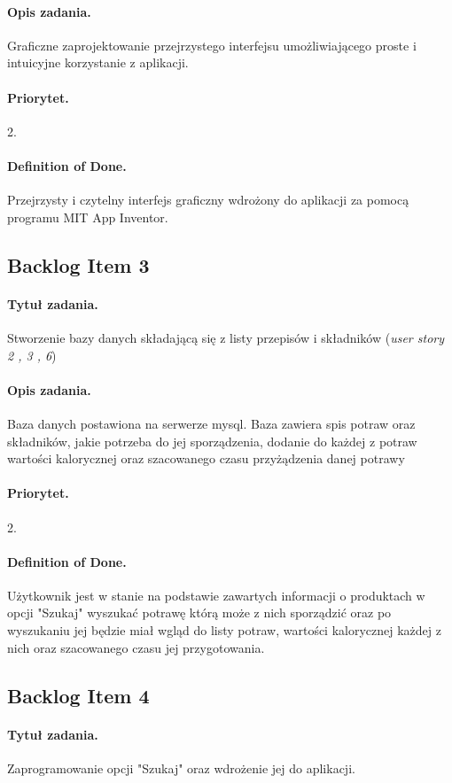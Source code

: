 \documentclass[a4paper]{article}
\begin{document}
	\paragraph{Opis zadania.} Graficzne zaprojektowanie przejrzystego interfejsu umożliwiającego proste i intuicyjne korzystanie z aplikacji.
	\paragraph{Priorytet.} 2.
	\paragraph{Definition of Done.} Przejrzysty i czytelny interfejs graficzny wdrożony do aplikacji za pomocą programu MIT App Inventor.
	
	\subsection{Backlog Item 3}
	\paragraph{Tytuł zadania.} Stworzenie bazy danych składającą się z listy przepisów i składników (\textit{user story 2 , 3 , 6})
	\paragraph{Opis zadania.} Baza danych postawiona na serwerze mysql. Baza zawiera spis potraw oraz składników, jakie potrzeba do jej sporządzenia, dodanie do każdej z potraw wartości kalorycznej oraz szacowanego czasu przyżądzenia danej potrawy
	\paragraph{Priorytet.} 2.
	\paragraph{Definition of Done.} Użytkownik jest w stanie na podstawie zawartych informacji o produktach w opcji "Szukaj" wyszukać potrawę którą może z nich sporządzić oraz po wyszukaniu jej będzie miał wgląd do listy potraw, wartości kalorycznej każdej z nich oraz szacowanego czasu jej przygotowania.
	
	\subsection{Backlog Item 4}
	\paragraph{Tytuł zadania.} Zaprogramowanie opcji "Szukaj" oraz wdrożenie jej do aplikacji.
\end{document}
